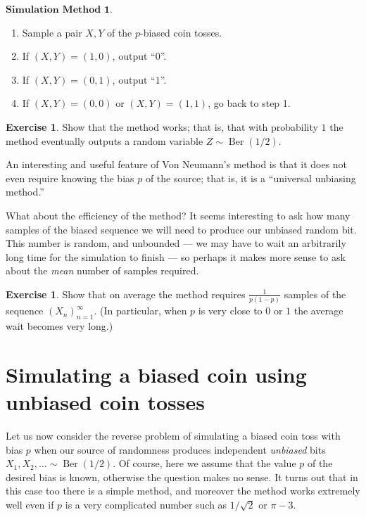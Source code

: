 \documentclass[11pt]{report}
\theoremstyle{plain}
\theoremstyle{definition}
\newtheorem{xexercise}[thm]{Exercise}
\begin{document}
$\textbf{Simulation Method 1.}$

\begin{enumerate}[label=\arabic*.]
\item Sample a pair $X,Y$ of the $p$-biased coin tosses.

\item If $(X,Y)=(1,0)$, output ``$0$''.

\item If $(X,Y)=(0,1)$, output ``$1$''.

\item If $(X,Y)=(0,0)$ or $(X,Y)=(1,1)$, go back to step 1.
\end{enumerate}

\begin{xexercise}
Show that the method works; that is, that with
probability $1$ the method eventually outputs a
random variable $Z \sim \operatorname{Ber}(1/2)$.
\end{xexercise}

An interesting and useful feature of Von Neumann's
method is that it does not even require knowing the
bias $p$ of the source; that is, it is a ``universal
unbiasing method.''

What about the efficiency of the method? It seems
interesting to ask how many samples of the biased
sequence we will need to produce our unbiased random
bit. This number is random, and unbounded --- we may
have to wait an arbitrarily long time for the
simulation to finish --- so perhaps it makes more
sense to ask about the \emph{mean} number of samples
required.

\begin{xexercise}
Show that on average the method requires
$\frac{1}{p(1-p)}$ samples of the sequence
$(X_n)_{n=1}^\infty$. (In particular, when $p$ is
very close to $0$ or $1$ the average wait becomes
very long.)
\end{xexercise}

\section{Simulating a biased coin using unbiased coin tosses}
Let us now consider the reverse problem of simulating
a biased coin toss with bias $p$ when our source of
randomness produces independent \emph{unbiased} bits
$X_1,X_2,\ldots \sim \operatorname{Ber}(1/2)$. Of
course, here we assume that the value $p$ of the
desired bias is known, otherwise the question makes no
sense. It turns out that in this case too there is a
simple method, and moreover the method works extremely
well even if $p$ is a very complicated number such as
$1/\sqrt{2}$ or $\pi-3$.
\end{document}
